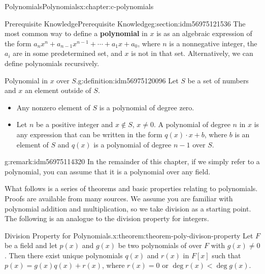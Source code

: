 \documentclass[twoside,10pt,]{book}
\newcommand{\terminology}[1]{\textbf{#1}}
\numberwithin{equation}{section}
\begin{document}
%
%
\typeout{************************************************}
\typeout{************************************************}
%
\begin{chapterptx}{Polynomials}{}{Polynomials}{}{}{x:chapter:c-polynomials}
%
%
\typeout{************************************************}
\typeout{************************************************}
%
\begin{sectionptx}{Prerequisite Knowledge}{}{Prerequisite Knowledge}{}{}{g:section:idm56975121536}
The most common way to define a \terminology{polynomial} in \(x\) is as an algebraic expression of the form \(a_n x^n + a_{n-1}x^{n-1}+ \cdots +a_1 x + a_0\), where \(n\) is a nonnegative integer, the \(a_i\) are in some predetermined set, and \(x\) is not in that set.  Alternatively, we can define polynomials recursively.%
\begin{definition}{Polynomial in \(x\) over \(S\).}{g:definition:idm56975120096}%
%
Let \(S\) be a set of numbers and \(x\) an element outside of \(S\).%
\begin{itemize}[label=\textbullet]
\item{}Any nonzero element of \(S\) is a polynomial of degree zero.%
\item{}Let \(n\) be a positive integer and \(x \notin S\), \(x \neq 0\).  A polynomial of degree \(n\) in \(x\) is any expression that can be written in the form \(q(x)\cdot x + b\), where \(b\) is an element of \(S\) and \(q(x)\) is a polynomial of degree \(n-1\) over \(S\).%
\end{itemize}
%
\end{definition}
\begin{remark}{}{g:remark:idm56975114320}%
In the remainder of this chapter, if we simply refer to a polynomial, you can assume that it is a polynomial over any field.%
\end{remark}
What follows is a series of theorems and basic properties relating to polynomials.  Proofs are available from many sources.  We assume you are familiar with polynomial addition and multiplication, so we take division as a starting point.  The following is an analogue to the division property for integers.%
\begin{theorem}{Division Property for Polynomials.}{}{x:theorem:theorem-poly-divison-property}%
%
Let \(F\) be a field and let \(p(x)\) and \(g(x)\) be two polynomials of over \(F\) with \(g(x) \neq  0\). Then there exist unique polynomials \(q(x)\) and \(r(x)\) in \(F[x]\) such that \(p(x) = g(x) q(x) + r(x)\), where \(r(x) = 0\) or \(\deg  r(x) < \deg  g(x)\).%

\end{theorem}
\end{sectionptx}
\end{chapterptx}
\end{document}

